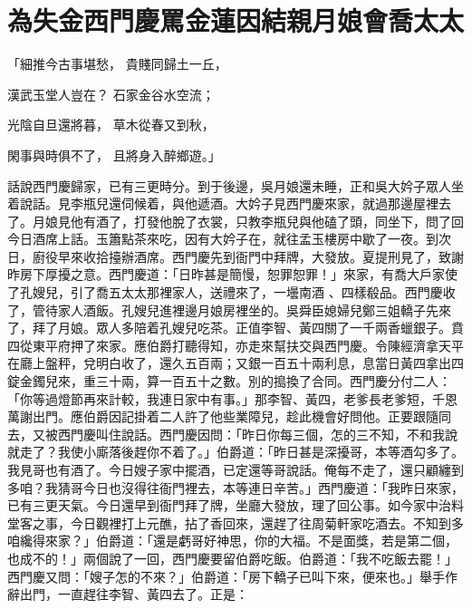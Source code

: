 %

\chapter{為失金西門慶罵金蓮\KG 因結親月娘會喬太太}


\begin{showcontents}{}



「細推今古事堪愁，  貴賤同歸土一丘，

漢武玉堂人豈在？  石家金谷水空流；

光陰自旦還將暮，  草木從春又到秋，

閑事與時俱不了，  且將身入醉鄉遊。」

話說西門慶歸家，已有三更時分。到于後邊，吳月娘還未睡，正和吳大妗子眾人坐着說話。見李瓶兒還伺候着，與他遞酒。大妗子見西門慶來家，就過那邊屋裡去了。月娘見他有酒了，打發他脫了衣裳，只教李瓶兒與他磕了頭，同坐下，問了回今日酒席上話。玉簫點茶來吃，因有大妗子在，就往孟玉樓房中歇了一夜。到次日，廚役早來收拾擡辦酒席。西門慶先到衙門中拜牌，大發放。夏提刑見了，致謝昨房下厚擾之意。西門慶道：「日昨甚是簡慢，恕罪恕罪！」來家，有喬大戶家使了孔嫂兒，引了喬五太太那裡家人，送禮來了，一壜南酒 、四樣殽品。西門慶收了，管待家人酒飯。孔嫂兒進裡邊月娘房裡坐的。吳舜臣媳婦兒鄭三姐轎子先來了，拜了月娘。眾人多陪着孔嫂兒吃茶。正值李智、黃四關了一千兩香蠟銀子。賁四從東平府押了來家。應伯爵打聽得知，亦走來幫扶交與西門慶。令陳經濟拿天平在廳上盤秤，兌明白收了，還久五百兩；又銀一百五十兩利息，息當日黃四拿出四錠金鐲兒來，重三十兩，算一百五十之數。別的搗換了合同。西門慶分付二人：「你等過燈節再來計較，我連日家中有事。」那李智、黃四，老爹長老爹短，千恩萬謝出門。應伯爵因記掛着二人許了他些業障兒，趁此機會好問他。正要跟隨同去，又被西門慶叫住說話。西門慶因問：「昨日你每三個，怎的三不知，不和我說就走了？我使小廝落後趕你不着了。」伯爵道：「昨日甚是深擾哥，本等酒勾多了。我見哥也有酒了。今日嫂子家中擺酒，已定還等哥說話。俺每不走了，還只顧纏到多咱？我猜哥今日也沒得往衙門裡去，本等連日辛苦。」西門慶道：「我昨日來家，已有三更天氣。今日還早到衙門拜了牌，坐廳大發放，理了回公事。如今家中治料堂客之事，今日觀裡打上元醮，拈了香回來，還趕了往周菊軒家吃酒去。不知到多咱纔得來家？」伯爵道：「還是虧哥好神思，你的大福。不是面獎，若是第二個，也成不的！」兩個說了一回，西門慶要留伯爵吃飯。伯爵道：「我不吃飯去罷！」西門慶又問：「嫂子怎的不來？」伯爵道：「房下轎子已叫下來，便來也。」舉手作辭出門，一直趕往李智、黃四去了。正是：


\end{showcontents}
